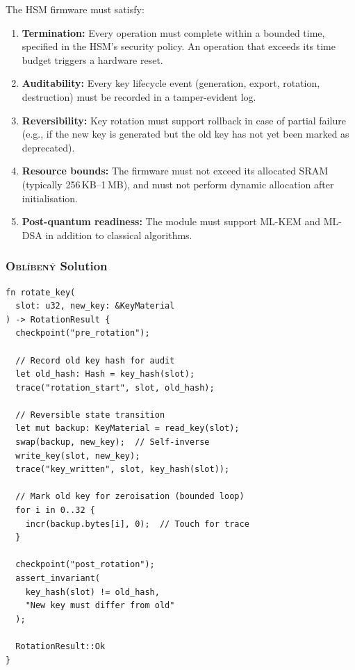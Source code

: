 \documentclass[11pt,a4paper]{article}
\newcommand{\obl}{\textsc{Obl\'{i}ben\'{y}}}
\begin{document}
The HSM firmware must satisfy:
\begin{enumerate}[nosep,label=(H\arabic*)]
  \item \textbf{Termination:}  Every operation must complete within a bounded
    time, specified in the HSM's security policy.  An operation that exceeds
    its time budget triggers a hardware reset.
  \item \textbf{Auditability:}  Every key lifecycle event (generation,
    export, rotation, destruction) must be recorded in a tamper-evident log.
  \item \textbf{Reversibility:}  Key rotation must support rollback in case
    of partial failure (e.g., if the new key is generated but the old key has
    not yet been marked as deprecated).
  \item \textbf{Resource bounds:}  The firmware must not exceed its allocated
    SRAM (typically 256\,KB--1\,MB), and must not perform dynamic allocation
    after initialisation.
  \item \textbf{Post-quantum readiness:}  The module must support ML-KEM and
    ML-DSA in addition to classical algorithms.
\end{enumerate}

\subsubsection{\obl{} Solution}

\begin{lstlisting}[language=oblibeny,caption={HSM key rotation in constrained form}]
fn rotate_key(
  slot: u32, new_key: &KeyMaterial
) -> RotationResult {
  checkpoint("pre_rotation");

  // Record old key hash for audit
  let old_hash: Hash = key_hash(slot);
  trace("rotation_start", slot, old_hash);

  // Reversible state transition
  let mut backup: KeyMaterial = read_key(slot);
  swap(backup, new_key);  // Self-inverse
  write_key(slot, new_key);
  trace("key_written", slot, key_hash(slot));

  // Mark old key for zeroisation (bounded loop)
  for i in 0..32 {
    incr(backup.bytes[i], 0);  // Touch for trace
  }

  checkpoint("post_rotation");
  assert_invariant(
    key_hash(slot) != old_hash,
    "New key must differ from old"
  );

  RotationResult::Ok
}
\end{lstlisting}
\end{document}
